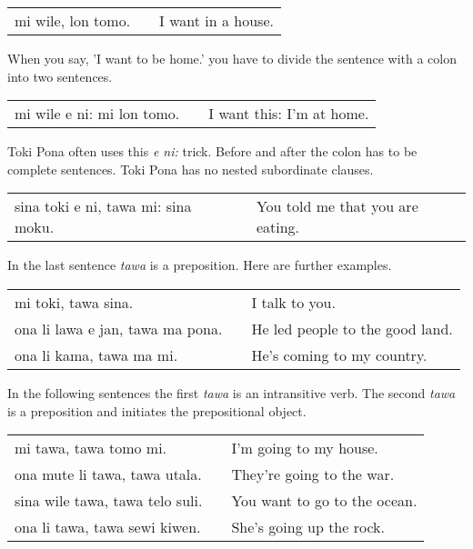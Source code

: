 \begin{supertabular}{p{5,5cm}|ll}
mi wile, lon tomo. && I want in a house. \\
\end{supertabular}

When you say, 'I want to be home.' you have to divide the sentence with a colon into two sentences.

\begin{supertabular}{p{5,5cm}|ll}
mi wile e ni: mi lon tomo. && I want this: I'm at home. \\
\end{supertabular} 

Toki Pona often uses this \textit{e ni:} trick. 
Before and after the colon has to be complete sentences. 
Toki Pona has no nested subordinate clauses.

\begin{supertabular}{p{5,5cm}|ll}
sina toki e ni, tawa mi: sina moku. && You told me that you are eating. \\
\end{supertabular} 

%
In the last sentence \textit{tawa} is a preposition. 
Here are further examples.

\begin{supertabular}{p{5,5cm}|ll}
mi toki, tawa sina. && I talk to you. \\
ona li lawa e jan, tawa ma pona. && He led people to the good land. \\
ona li kama, tawa ma mi. && He's coming to my country. \\
\end{supertabular} 

In the following sentences the first \textit{tawa} is an intransitive verb.
The second \textit{tawa} is a preposition and initiates the prepositional object. 

\begin{supertabular}{p{5,5cm}|ll}
mi tawa, tawa tomo mi. && I'm going to my house. \\
ona mute li tawa, tawa utala. && They're going to the war. \\
sina wile tawa, tawa telo suli. && You want to go to the ocean. \\
ona li tawa, tawa sewi kiwen. && She's going up the rock. \\
\end{supertabular} 

